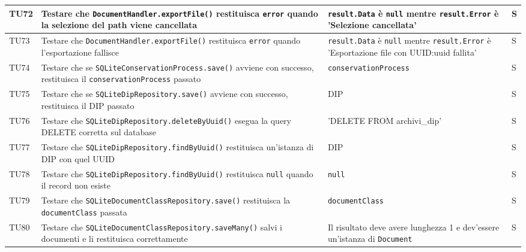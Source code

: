 \documentclass[a4paper,12pt]{article}
\begin{document}
\begin{longtable}{|M{1.2cm}|M{5cm}|M{5cm}|M{1.5cm}|}
            TU72 & Testare che \texttt{DocumentHandler.exportFile()} restituisca \texttt{error} quando la selezione del path viene cancellata & \texttt{result.Data} è \texttt{null} mentre \texttt{result.Error} è 'Selezione cancellata' & S \\
            \hline

            TU73 & Testare che \texttt{DocumentHandler.exportFile()} restituisca \texttt{error} quando l'esportazione fallisce & \texttt{result.Data} è \texttt{null} mentre \texttt{result.Error} è 'Esportazione file con UUID:uuid fallita' & S \\
            \hline


            TU74 & Testare che se \texttt{SQLiteConservationProcess.save()} avviene con successo, restituisca il \texttt{conservationProcess} passato & \texttt{conservationProcess} & S \\
            \hline

            TU75 & Testare che se \texttt{SQLiteDipRepository.save()} avviene con successo, restituisca il DIP passato & DIP & S \\
            \hline

            TU76 & Testare che \texttt{SQLiteDipRepository.deleteByUuid()} esegua la query DELETE corretta sul database & 'DELETE FROM archivi\_dip' & S \\
            \hline

            TU77 & Testare che \texttt{SQLiteDipRepository.findByUuid()} restituisca un'istanza di DIP con quel UUID & DIP & S \\
            \hline

            TU78 & Testare che \texttt{SQLiteDipRepository.findByUuid()} restituisca \texttt{null} quando il record non esiste & \texttt{null} & S \\
            \hline

            TU79 & Testare che \texttt{SQLiteDocumentClassRepository.save()} restituisca la \texttt{documentClass} passata & \texttt{documentClass} & S \\
            \hline

            TU80 & Testare che \texttt{SQLiteDocumentClassRepository.saveMany()} salvi i documenti e li restituisca correttamente & Il risultato deve avere lunghezza 1 e dev'essere un'istanza di \texttt{Document} & S \\
            \hline


\end{longtable}
\end{document}
